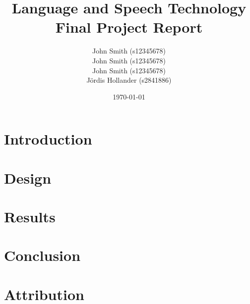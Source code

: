 \documentclass{article}
\begin{document}
\title{Language and Speech Technology Final Project Report}
\author{
  John Smith (s12345678)      \\
  John Smith (s12345678)      \\
  John Smith (s12345678)      \\
  Jördis Hollander (s2841886) \\
}
\date{\today}
\maketitle

\section{Introduction}

\section{Design}

\section{Results}

\section{Conclusion}

\section{Attribution}
\end{document}
